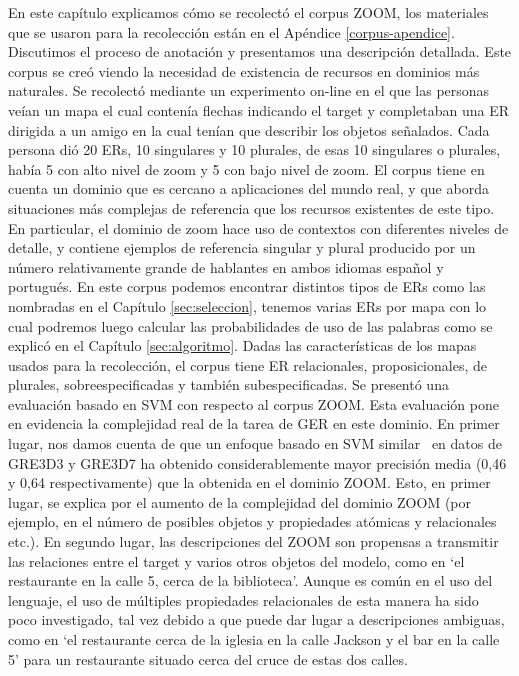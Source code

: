 En este cap\'itulo explicamos c\'omo se recolect\'o el corpus ZOOM, los materiales que se usaron para la recolecci\'on est\'an en el Ap\'endice \ref{corpus-apendice}. Discutimos el proceso de anotaci\'on y presentamos una descripci\'on detallada.
Este corpus se cre\'o viendo la necesidad de existencia de recursos en dominios m\'as naturales. Se recolect\'o mediante un experimento on-line en el que las personas ve\'ian un mapa el cual conten\'ia flechas indicando el target y completaban una ER dirigida a un amigo en la cual ten\'ian que describir los objetos se\~nalados. Cada persona di\'o 20 ERs, 10 singulares y 10 plurales, de esas 10 singulares o plurales, hab\'ia 5 con alto nivel de zoom y 5 con bajo nivel de zoom.
El corpus tiene en cuenta un dominio que es cercano a aplicaciones del mundo real, y que aborda situaciones m\'as complejas de referencia que los recursos existentes de este tipo. En particular, el dominio de zoom hace uso de contextos con diferentes niveles de detalle, y contiene ejemplos de referencia singular y plural producido por un n\'umero relativamente grande de hablantes en ambos idiomas espa\~nol y portugu\'es.
En este corpus podemos encontrar distintos tipos de ERs como las nombradas en el Cap\'itulo \ref{sec:seleccion}, tenemos varias ERs por mapa con lo cual podremos luego calcular las probabilidades de uso de las palabras como se explic\'o en el Cap\'itulo \ref{sec:algoritmo}. Dadas las caracter\'isticas de los mapas usados para la recolecci\'on, el corpus tiene ER relacionales, proposicionales, de plurales, sobreespecificadas y tambi\'en subespecificadas.
Se present\'o una evaluaci\'on basado en SVM con respecto al corpus ZOOM. Esta evaluaci\'on pone en evidencia la complejidad real de la tarea de GER en este dominio.
En primer lugar, nos damos cuenta de que un enfoque basado en SVM similar~\cite{thiago-svm} en datos de GRE3D3 y GRE3D7 ha obtenido considerablemente mayor precisi\'on media (0,46 y 0,64 respectivamente) que la obtenida en el dominio ZOOM. Esto, en primer lugar, se explica por el aumento de la complejidad del dominio ZOOM (por ejemplo, en el n\'umero de posibles objetos y propiedades at\'omicas y relacionales etc.). 
En segundo lugar, las descripciones del ZOOM son propensas a transmitir las relaciones entre el target y varios otros objetos del modelo, como en `el restaurante en la calle 5, cerca de la biblioteca'. Aunque es com\'un en el uso del lenguaje, el uso de m\'ultiples propiedades relacionales de esta manera ha sido poco investigado, tal vez debido a que puede dar lugar a descripciones ambiguas, como en `el restaurante cerca de la iglesia en la calle Jackson y el bar en la calle 5' para un restaurante situado cerca del cruce de estas dos calles.
